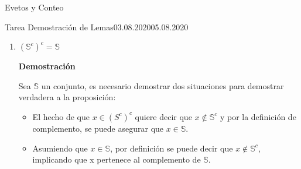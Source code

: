 \documentclass[a4paper]{book}
\begin{document}
\begin{chapter}{Evetos y Conteo}
\begin{tarea}{Tarea Demostración de Lemas}{03.08.2020}{05.08.2020}
\begin{enumerate}
                    \begin{itemize}
                        \item Si $x\in\left( \mathbb S\cap\left( \mathbb
                            T\cup\mathbb U \right) \right)$ significa que
                            $x\in\mathbb S$ y también que $x\in\left( \mathbb
                            T\cup\mathbb U \right)$ es decir, que
                            incondicionalmente $x\in\mathbb S$ pero también
                            $x\in\mathbb T$ ó $x\in\mathbb U$. Por lo tanto se
                            puede decir que $x\in\left( \left( \mathbb
                            S\cap\mathbb T \right)\cup\left( \mathbb
                            S\cap\mathbb U\right) \right)$.
                        \item Por otro lado hay que asumir que $x\in\left(
                            \left( \mathbb S\cap\mathbb T\right)\cup\left(
                            \mathbb S\cap\mathbb U\right) \right)$, lo que
                            significa que ó $x\in\left( \mathbb S\cap\mathbb T
                            \right)$ ó $x\in\left( \mathbb S\cap\mathbb U
                            \right)$. A partir de lo anterior se puede asegurar
                            que $x\in\mathbb S$ y que $x\in\mathbb T$ ó
                            $x\in\mathbb U$, que es lo mismo que decir
                            $x\in\left( \mathbb S\cap\left( \mathbb
                            T\cup\mathbb U \right) \right)$
                    \end{itemize}

                    Ya que se cumplen ambas condiciones, se puede concluir que
                    la proposición es verdadera. $\blacksquare$

                \item $(\mathbb S^{c})^{c} = \mathbb S$

                \textbf{Demostración}

                Sea $\mathbb S$ un conjunto, es necesario demostrar dos
                situaciones para demostrar verdadera a la proposición:

                \begin{itemize}
                    \item El hecho de que $x\in(S^{c})^{c}$ quiere decir que
                        $x\notin\mathbb S^{c}$ y por la definición de
                        complemento, se puede asegurar que $x\in\mathbb S$.
                    \item Asumiendo que $x\in\mathbb S$, por definición se
                        puede decir que $x\notin\mathbb S^{c}$, implicando que
                        x pertenece al complemento de $\mathbb S$.
                \end{itemize}


\end{enumerate}
\end{tarea}
\end{chapter}
\end{document}
